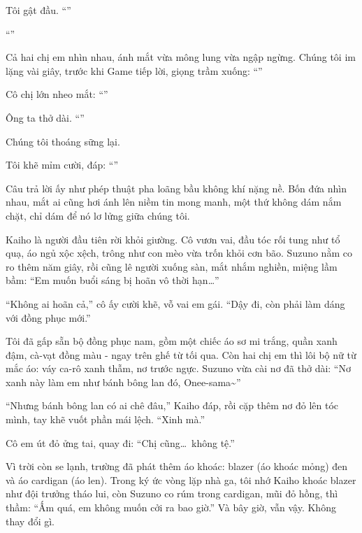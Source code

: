 \documentclass[../main.tex]{subfiles}
\begin{document}
Tôi gật đầu. ``''

``''

Cả hai chị em nhìn nhau, ánh mắt vừa mông lung vừa ngập ngừng. Chúng tôi im lặng vài giây, trước khi Game tiếp lời, giọng trầm xuống: ``''

Cô chị lớn nheo mắt: ``''

Ông ta thở dài. ``''

Chúng tôi thoáng sững lại.

Tôi khẽ mỉm cười, đáp: ``''

Câu trả lời ấy như phép thuật pha loãng bầu không khí nặng nề. Bốn đứa nhìn nhau, mắt ai cũng hơi ánh lên niềm tin mong manh, một thứ không dám nắm chặt, chỉ dám để nó lơ lửng giữa chúng tôi.

Kaiho là người đầu tiên rời khỏi giường. Cô vươn vai, đầu tóc rối tung như tổ quạ, áo ngủ xộc xệch, trông như con mèo vừa trốn khỏi cơn bão. Suzuno nằm co ro thêm năm giây, rồi cũng lê người xuống sàn, mắt nhắm nghiền, miệng lầm bầm: ``Em muốn buổi sáng bị hoãn vô thời hạn\dots''

``Không ai hoãn cả,'' cô ấy cười khẽ, vỗ vai em gái. ``Dậy đi, còn phải làm dáng với đồng phục mới.''

Tôi đã gấp sẵn bộ đồng phục nam, gồm một chiếc áo sơ mi trắng, quần xanh đậm, cà-vạt đồng màu - ngay trên ghế từ tối qua. Còn hai chị em thì lôi bộ nữ từ mắc áo: váy ca-rô xanh thẫm, nơ trước ngực. Suzuno vừa cài nơ đã thở dài: ``Nơ xanh này làm em như bánh bông lan đó, Onee-sama\~{}''

``Nhưng bánh bông lan có ai chê đâu,'' Kaiho đáp, rồi cặp thêm nơ đỏ lên tóc mình, tay khẽ vuốt phần mái lệch. ``Xinh mà.''

Cô em út đỏ ửng tai, quay đi: ``Chị cũng\dots\ không tệ.''

Vì trời còn se lạnh, trường đã phát thêm áo khoác: blazer (áo khoác mỏng) đen và áo cardigan (áo len). Trong ký ức vòng lặp nhà ga, tôi nhớ Kaiho khoác blazer như đội trưởng tháo lui, còn Suzuno co rúm trong cardigan, mũi đỏ hồng, thì thầm: ``Ấm quá, em không muốn cởi ra bao giờ.'' Và bây giờ, vẫn vậy. Không thay đổi gì.
\end{document}
